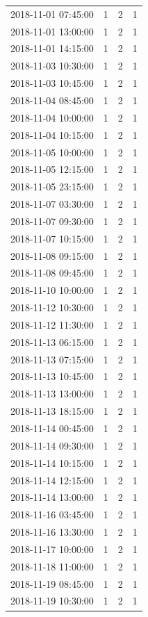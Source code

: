 \begin{tabular}{lrrr}
2018-11-01 07:45:00 & 1 & 2 & 1 \\
2018-11-01 13:00:00 & 1 & 2 & 1 \\
2018-11-01 14:15:00 & 1 & 2 & 1 \\
2018-11-03 10:30:00 & 1 & 2 & 1 \\
2018-11-03 10:45:00 & 1 & 2 & 1 \\
2018-11-04 08:45:00 & 1 & 2 & 1 \\
2018-11-04 10:00:00 & 1 & 2 & 1 \\
2018-11-04 10:15:00 & 1 & 2 & 1 \\
2018-11-05 10:00:00 & 1 & 2 & 1 \\
2018-11-05 12:15:00 & 1 & 2 & 1 \\
2018-11-05 23:15:00 & 1 & 2 & 1 \\
2018-11-07 03:30:00 & 1 & 2 & 1 \\
2018-11-07 09:30:00 & 1 & 2 & 1 \\
2018-11-07 10:15:00 & 1 & 2 & 1 \\
2018-11-08 09:15:00 & 1 & 2 & 1 \\
2018-11-08 09:45:00 & 1 & 2 & 1 \\
2018-11-10 10:00:00 & 1 & 2 & 1 \\
2018-11-12 10:30:00 & 1 & 2 & 1 \\
2018-11-12 11:30:00 & 1 & 2 & 1 \\
2018-11-13 06:15:00 & 1 & 2 & 1 \\
2018-11-13 07:15:00 & 1 & 2 & 1 \\
2018-11-13 10:45:00 & 1 & 2 & 1 \\
2018-11-13 13:00:00 & 1 & 2 & 1 \\
2018-11-13 18:15:00 & 1 & 2 & 1 \\
2018-11-14 00:45:00 & 1 & 2 & 1 \\
2018-11-14 09:30:00 & 1 & 2 & 1 \\
2018-11-14 10:15:00 & 1 & 2 & 1 \\
2018-11-14 12:15:00 & 1 & 2 & 1 \\
2018-11-14 13:00:00 & 1 & 2 & 1 \\
2018-11-16 03:45:00 & 1 & 2 & 1 \\
2018-11-16 13:30:00 & 1 & 2 & 1 \\
2018-11-17 10:00:00 & 1 & 2 & 1 \\
2018-11-18 11:00:00 & 1 & 2 & 1 \\
2018-11-19 08:45:00 & 1 & 2 & 1 \\
2018-11-19 10:30:00 & 1 & 2 & 1 \\

\end{tabular}
